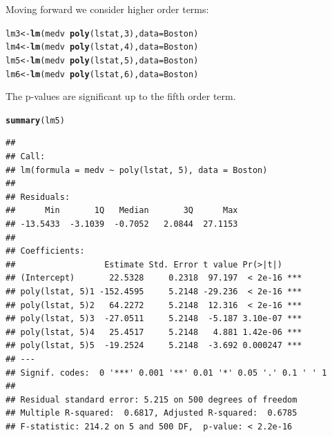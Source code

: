 \documentclass[11pt]{article}\usepackage[]{graphicx}\usepackage[]{color}
\makeatletter
\newcommand{\hlnum}[1]{\textcolor[rgb]{0.686,0.059,0.569}{#1}}%
\newcommand{\hlopt}[1]{\textcolor[rgb]{0,0,0}{#1}}%
\newcommand{\hlstd}[1]{\textcolor[rgb]{0.345,0.345,0.345}{#1}}%
\newcommand{\hlkwb}[1]{\textcolor[rgb]{0.69,0.353,0.396}{#1}}%
\newcommand{\hlkwc}[1]{\textcolor[rgb]{0.333,0.667,0.333}{#1}}%
\newcommand{\hlkwd}[1]{\textcolor[rgb]{0.737,0.353,0.396}{\textbf{#1}}}%
\newenvironment{kframe}{%
 \def\at@end@of@kframe{}%
 \ifinner\ifhmode%
  \def\at@end@of@kframe{\end{minipage}}%
  \begin{minipage}{\columnwidth}%
 \fi\fi%
 \def\FrameCommand##1{\hskip\@totalleftmargin \hskip-\fboxsep
 \colorbox{shadecolor}{##1}\hskip-\fboxsep
     \hskip-\linewidth \hskip-\@totalleftmargin \hskip\columnwidth}%
 \MakeFramed {\advance\hsize-\width
   \@totalleftmargin\z@ \linewidth\hsize
   \@setminipage}}%
 {\par\unskip\endMakeFramed%
 \at@end@of@kframe}
\newenvironment{knitrout}{}{} %
\makeatother
\begin{document}
Moving forward we consider higher order terms:
\begin{knitrout}
\color{fgcolor}\begin{kframe}
\begin{alltt}
\hlstd{lm3} \hlkwb{<-} \hlkwd{lm}\hlstd{(medv} \hlopt{~} \hlkwd{poly}\hlstd{(lstat,} \hlnum{3}\hlstd{),} \hlkwc{data}\hlstd{=Boston)}
\hlstd{lm4} \hlkwb{<-} \hlkwd{lm}\hlstd{(medv} \hlopt{~} \hlkwd{poly}\hlstd{(lstat,} \hlnum{4}\hlstd{),} \hlkwc{data}\hlstd{=Boston)}
\hlstd{lm5} \hlkwb{<-} \hlkwd{lm}\hlstd{(medv} \hlopt{~} \hlkwd{poly}\hlstd{(lstat,} \hlnum{5}\hlstd{),} \hlkwc{data}\hlstd{=Boston)}
\hlstd{lm6} \hlkwb{<-} \hlkwd{lm}\hlstd{(medv} \hlopt{~} \hlkwd{poly}\hlstd{(lstat,} \hlnum{6}\hlstd{),} \hlkwc{data}\hlstd{=Boston)}
\end{alltt}
\end{kframe}
\end{knitrout}

The p-values are significant up to the fifth order term.
\begin{knitrout}
\color{fgcolor}\begin{kframe}
\begin{alltt}
\hlkwd{summary}\hlstd{(lm5)}
\end{alltt}
\begin{verbatim}
## 
## Call:
## lm(formula = medv ~ poly(lstat, 5), data = Boston)
## 
## Residuals:
##      Min       1Q   Median       3Q      Max 
## -13.5433  -3.1039  -0.7052   2.0844  27.1153 
## 
## Coefficients:
##                  Estimate Std. Error t value Pr(>|t|)    
## (Intercept)       22.5328     0.2318  97.197  < 2e-16 ***
## poly(lstat, 5)1 -152.4595     5.2148 -29.236  < 2e-16 ***
## poly(lstat, 5)2   64.2272     5.2148  12.316  < 2e-16 ***
## poly(lstat, 5)3  -27.0511     5.2148  -5.187 3.10e-07 ***
## poly(lstat, 5)4   25.4517     5.2148   4.881 1.42e-06 ***
## poly(lstat, 5)5  -19.2524     5.2148  -3.692 0.000247 ***
## ---
## Signif. codes:  0 '***' 0.001 '**' 0.01 '*' 0.05 '.' 0.1 ' ' 1
## 
## Residual standard error: 5.215 on 500 degrees of freedom
## Multiple R-squared:  0.6817,	Adjusted R-squared:  0.6785 
## F-statistic: 214.2 on 5 and 500 DF,  p-value: < 2.2e-16
\end{verbatim}
\end{kframe}
\end{knitrout}
\clearpage
\end{document}
